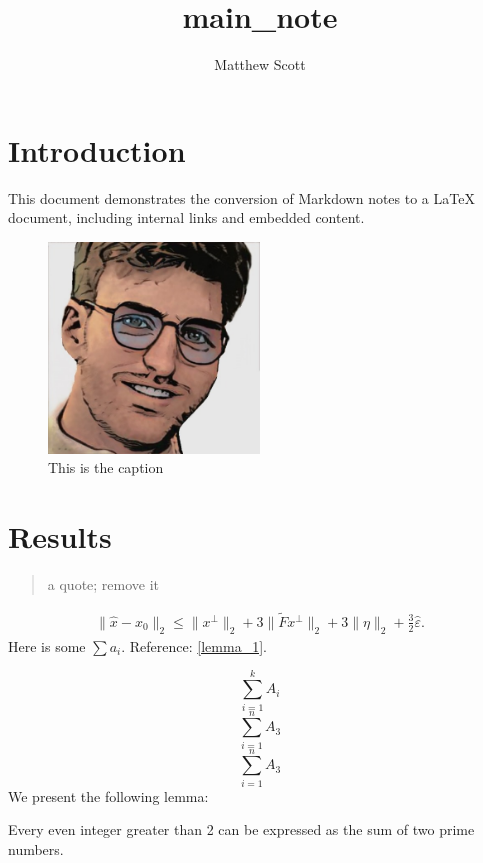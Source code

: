 \documentclass{article}
\title{main\_note}
\author{Matthew Scott}
\begin{document}
\maketitle
{}
\section{Introduction}
\label{introduction}
This document demonstrates the conversion of Markdown notes to a LaTeX document, including internal links and embedded content.

\begin{figure}[h]
  \centering
  \includegraphics[width=0.5\textwidth]{Files/download.jpeg}
  \caption{This is the caption}
\end{figure}
\section{Results}
\label{results}


\begin{quote}
  a quote; remove it

\end{quote}
\begin{align*}
  \|\hat x - x_0\|_2
  \leq \|x^\perp\|_2 + 3\|\tilde{F}x^\perp\|_2 + 3 \|\eta\|_2 + \frac{3}{2}\hat\varepsilon.
\end{align*}
Here is some $\sum a_i$. Reference: \autoref{lemma_1}.

$$\sum_{i=1}^k A_i$$
$$\sum_{i=1}^n A_3$$
$$\sum_{i=1}^n A_3$$
We present the following lemma:

\begin{lemma}
  \label{lemma_1}
  Every even integer greater than 2 can be expressed as the sum of two prime numbers.

\end{lemma}
\end{document}
